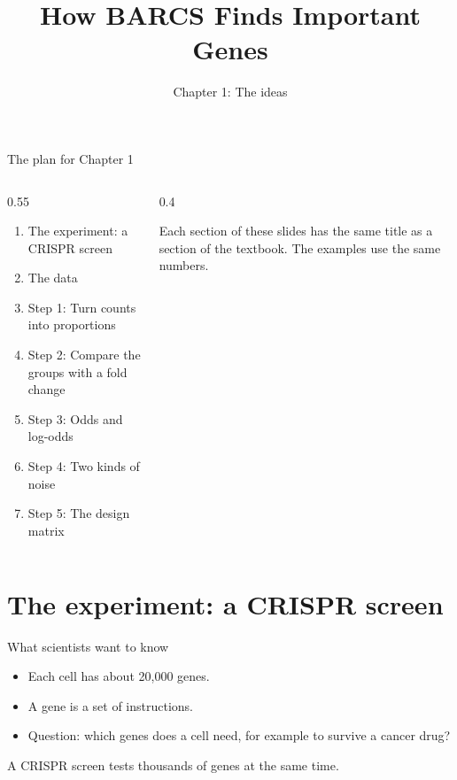 \documentclass[aspectratio=169,11pt]{beamer}
\title{How BARCS Finds Important Genes}
\subtitle{Chapter 1: The ideas}
\begin{document}
\maketitle

\begin{frame}{The plan for Chapter 1}
\begin{columns}[T]
\begin{column}{0.55\textwidth}
\begin{enumerate}
\item The experiment: a CRISPR screen
\item The data
\item Step 1: Turn counts into proportions
\item Step 2: Compare the groups with a fold change
\item Step 3: Odds and log-odds
\item Step 4: Two kinds of noise
\item Step 5: The design matrix
\end{enumerate}
\end{column}
\begin{column}{0.4\textwidth}
\begin{remember}
Each section of these slides has the same title as a section of the
textbook. The examples use the same numbers.
\end{remember}
\end{column}
\end{columns}
\end{frame}

\section{The experiment: a CRISPR screen}

\begin{frame}{What scientists want to know}
\begin{itemize}
\item Each cell has about 20{,}000 genes.
\item A gene is a set of instructions.
\item Question: which genes does a cell need, for example to survive a
  cancer drug?
\end{itemize}
\bigskip
A \alert{CRISPR screen} tests thousands of genes at the same time.
\end{frame}
\end{document}
